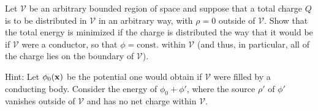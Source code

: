 \newcommand{\cV}{\mathcal{V}}
\newcommand{\phio}{\phi_0}
\newcommand{\phiox}{\phio(\vx)}
\newcommand{\const}{\text{const.}}
\newcommand{\sig}{\sigma}
\newcommand{\alp}{\alpha}
\newcommand{\sigtv}{\sig(\tht, \vph)}

\newcommand{\sE}{\mathscr{E}}
\newcommand{\dcx}{\dd[3]{x}}
\newcommand{\rhoo}{\rho_0}
\newcommand{\evS}{|_S}
\newcommand{\intV}{\int_\cV}
\newcommand{\vE}{\vec{E}}

\begin{statement}{}
	Let $\cV$ be an arbitrary bounded region of space and suppose that a total charge $Q$ is to be distributed in $\cV$ in an arbitrary way, with $\rho = 0$ outside of $\cV$.  Show that the total energy is minimized if the charge is distributed the way that it would be if $\cV$ were a conductor, so that $\phi = \const$ within $\cV$ (and thus, in particular, all of the charge lies on the boundary of $\cV$).
	
	Hint: Let $\phiox$ be the potential one would obtain if $\cV$ were filled by a conducting body.  Consider the energy of $\phio + \phi'$, where the source $\rho'$ of $\phi'$ vanishes outside of $\cV$ and has no net charge within $\cV$.
\end{statement}

